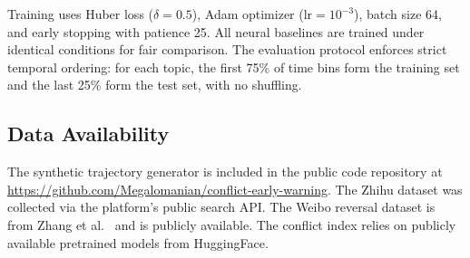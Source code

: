 \documentclass[11pt,a4paper]{article}
\begin{document}
Training uses Huber loss ($\delta=0.5$), Adam optimizer ($\text{lr}=10^{-3}$), batch size 64, and early stopping with patience 25. All neural baselines are trained under identical conditions for fair comparison. The evaluation protocol enforces strict temporal ordering: for each topic, the first 75\% of time bins form the training set and the last 25\% form the test set, with no shuffling.



\subsection{Data Availability}

The synthetic trajectory generator is included in the public code repository at \url{https://github.com/Megalomanian/conflict-early-warning}. The Zhihu dataset was collected via the platform's public search API. The Weibo reversal dataset is from Zhang et al.~\cite{Zhang2023Reversal} and is publicly available. The conflict index relies on publicly available pretrained models from HuggingFace.



\end{document}
